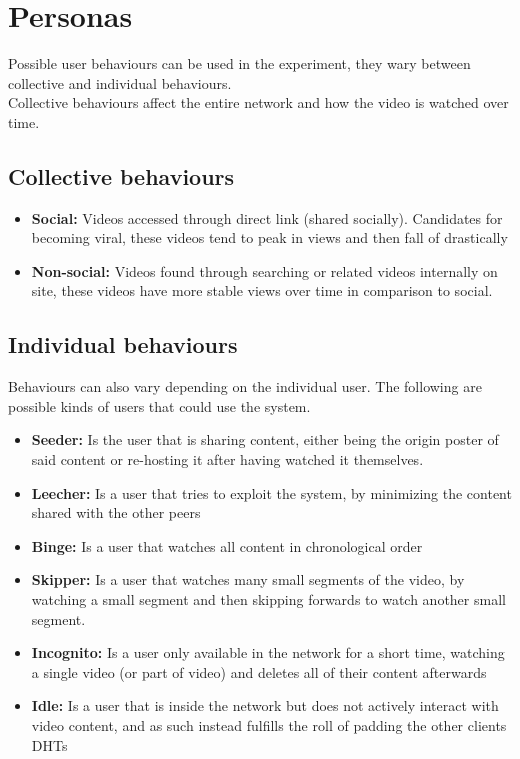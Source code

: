 \section{Personas}
Possible user behaviours can be used in the experiment, they wary between collective and individual behaviours.\\
Collective behaviours affect the entire network and how the video is watched over time.
\subsection{Collective behaviours}
\begin{itemize}
    \item \textbf{Social:}
    Videos accessed through direct link (shared socially). Candidates for becoming viral, these videos tend to peak in views and then fall of drastically
    \item \textbf{Non-social:}
    Videos found through searching or related videos internally on site, these videos have more stable views over time in comparison to social.
\end{itemize}

\subsection{Individual behaviours}
\label{sec:individual-behavious}
Behaviours can also vary depending on the individual user. The following are possible kinds of users that could use the system.
\begin{itemize}
    \item \textbf{Seeder:}
    Is the user that is sharing content, either being the origin poster of said content or re-hosting it after having watched it themselves.
    \item \textbf{Leecher:}
    Is a user that tries to exploit the system, by minimizing the content shared with the other peers %
    \item \textbf{Binge:}
    Is a user that watches all content in chronological order
    \item \textbf{Skipper:}
    Is a user that watches many small segments of the video, by watching a small segment and then skipping forwards to watch another small segment.
    \item \textbf{Incognito:}
    Is a user only available in the network for a short time, watching a single video (or part of video) and deletes all of their content afterwards
    \item \textbf{Idle:}
    Is a user that is inside the network but does not actively interact with video content, and as such instead fulfills the roll of padding the other clients \acp{DHT}
\end{itemize}

